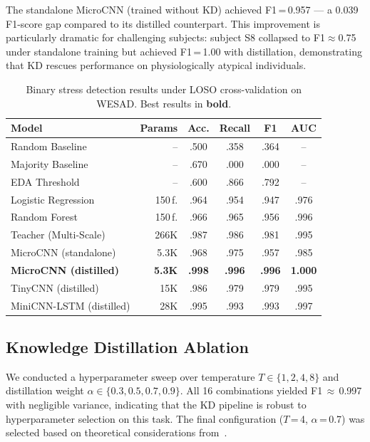 \documentclass[conference]{IEEEtran}
\begin{document}
The standalone MicroCNN (trained without KD) achieved F1\,=\,0.957 --- a 0.039 F1-score gap compared to its distilled counterpart. This improvement is particularly dramatic for challenging subjects: subject S8 collapsed to F1$\approx$0.75 under standalone training but achieved F1\,=\,1.00 with distillation, demonstrating that KD rescues performance on physiologically atypical individuals.

\begin{table}[t]
\centering
\caption{Binary stress detection results under LOSO cross-validation on WESAD. Best results in \textbf{bold}.}
\label{tab:results}
\begin{tabular}{lrcccc}
\toprule
Model & Params & Acc. & Recall & F1 & AUC \\
\midrule
Random Baseline & -- & .500 & .358 & .364 & -- \\
Majority Baseline & -- & .670 & .000 & .000 & -- \\
EDA Threshold & -- & .600 & .866 & .792 & -- \\
\midrule
Logistic Regression & 150\,f. & .964 & .954 & .947 & .976 \\
Random Forest & 150\,f. & .966 & .965 & .956 & .996 \\
\midrule
Teacher (Multi-Scale) & 266K & .987 & .986 & .981 & .995 \\
MicroCNN (standalone) & 5.3K & .968 & .975 & .957 & .985 \\
\textbf{MicroCNN (distilled)} & \textbf{5.3K} & \textbf{.998} & \textbf{.996} & \textbf{.996} & \textbf{1.000} \\
TinyCNN (distilled) & 15K & .986 & .979 & .979 & .995 \\
MiniCNN-LSTM (distilled) & 28K & .995 & .993 & .993 & .997 \\
\bottomrule
\end{tabular}
\end{table}

\subsection{Knowledge Distillation Ablation}

We conducted a hyperparameter sweep over temperature $T \in \{1, 2, 4, 8\}$ and distillation weight $\alpha \in \{0.3, 0.5, 0.7, 0.9\}$. All 16 combinations yielded F1\,$\approx$\,0.997 with negligible variance, indicating that the KD pipeline is robust to hyperparameter selection on this task. The final configuration ($T$\,=\,4, $\alpha$\,=\,0.7) was selected based on theoretical considerations from~\cite{hinton2015distilling}.
\end{document}
